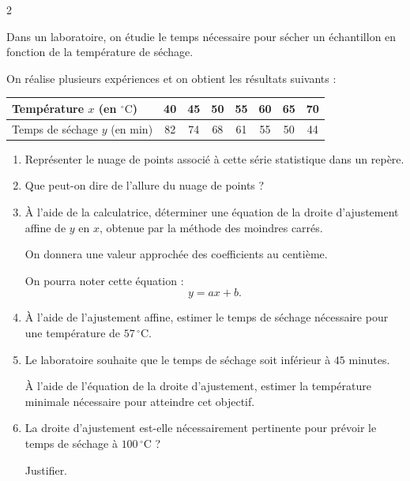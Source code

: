 \documentclass[10pt,a4paper]{article}
\begin{document}
\begin{multicols}{2}
\begin{exo}[][ccf]
    Dans un laboratoire, on étudie le temps nécessaire pour sécher un échantillon en fonction de la température de séchage.

    On réalise plusieurs expériences et on obtient les résultats suivants :

    \begin{center}
        \begin{tabular}{|p{2.5cm}|*{7}{c|}}
            \hline
            Température \(x\) (en \(^\circ\mathrm{C}\))
            & 40 & 45 & 50 & 55 & 60 & 65 & 70 \\
            \hline
            Temps de séchage \(y\) (en min)
            & 82 & 74 & 68 & 61 & 55 & 50 & 44 \\
            \hline
        \end{tabular}
    \end{center}

    \begin{enumerate}
        \item Représenter le nuage de points associé à cette série statistique dans un repère.

        \item Que peut-on dire de l'allure du nuage de points ?

        \item À l'aide de la calculatrice, déterminer une équation de la droite d'ajustement affine de \(y\) en \(x\), obtenue par la méthode des moindres carrés.

        On donnera une valeur approchée des coefficients au centième.

        On pourra noter cette équation :
        \[
            y=ax+b.
        \]

        \item À l'aide de l'ajustement affine, estimer le temps de séchage nécessaire pour une température de \(57\,^\circ\mathrm{C}\).

        \item Le laboratoire souhaite que le temps de séchage soit inférieur à \(45\) minutes.

        À l'aide de l'équation de la droite d'ajustement, estimer la température minimale nécessaire pour atteindre cet objectif.

        \item La droite d'ajustement est-elle nécessairement pertinente pour prévoir le temps de séchage à \(100\,^\circ\mathrm{C}\) ?
        
        Justifier.
    \end{enumerate}
\end{exo}


\end{multicols}
\end{document}
